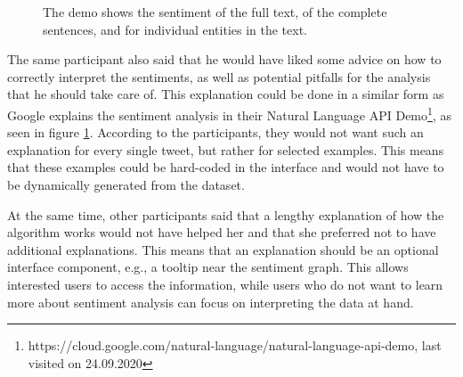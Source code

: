 \begin{figure}[htb!]
    \centering
    \caption{The demo shows the sentiment of the full text, of the complete sentences, and for individual entities in the text.}
    \label{fig:sentiment_google}
\end{figure}

The same participant also said that he would have liked some advice on how to correctly interpret the sentiments, as well as potential pitfalls for the analysis that he should take care of. This explanation could be done in a similar form as Google explains the sentiment analysis in their Natural Language API Demo\footnote{https://cloud.google.com/natural-language/natural-language-api-demo, last visited on 24.09.2020}, as seen in figure \ref{fig:sentiment_google}. According to the participants, they would not want such an explanation for every single tweet, but rather for selected examples. This means that these examples could be hard-coded in the interface and would not have to be dynamically generated from the dataset.

At the same time, other participants said that a lengthy explanation of how the algorithm works would not have helped her and that she preferred not to have additional explanations. This means that an explanation should be an optional interface component, e.g., a tooltip near the sentiment graph. This allows interested users to access the information, while users who do not want to learn more about sentiment analysis can focus on interpreting the data at hand.

